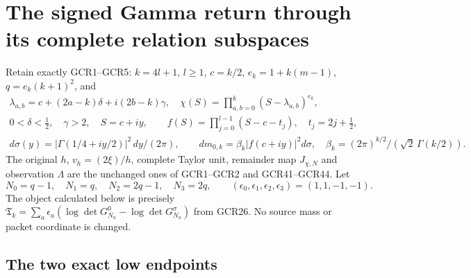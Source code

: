 \section{The signed Gamma return through its complete relation subspaces}
\label{sec:gsr-signed-gamma}

Retain exactly GCR1--GCR5: $k=4l+1$, $l\geq1$,
$c=k/2$, $e_k=1+k(m-1)$, $q=e_k(k+1)^2$, and
\[
\begin{gathered}
 \lambda_{a,b}=c+(2a-k)\delta+i(2b-k)\gamma,\quad
 \chi(S)=\prod_{a,b=0}^k(S-\lambda_{a,b})^{e_k},\\
 0<\delta<\tfrac12,\quad\gamma>2,\quad S=c+iy,\qquad
 f(S)=\prod_{j=0}^{l-1}(S-c-t_j),\quad t_j=2j+\tfrac12,\\
 d\sigma(y)=|\Gamma(1/4+iy/2)|^2\,dy/(2\pi),\qquad
 dm_{0,k}=\beta_k|f(c+iy)|^2d\sigma,\quad
 \beta_k=(2\pi)^{k/2}/(\sqrt2\,\Gamma(k/2)).
\end{gathered}\tag{GSR1}
\]
The original $h$, $v_h=(2\xi)/h$, complete Taylor unit,
remainder map $J_{\chi,N}$ and observation $\Lambda$ are the
unchanged ones of GCR1--GCR2 and GCR41--GCR44.
Let
\[
 N_0=q-1,\quad N_1=q,\quad N_2=2q-1,\quad N_3=2q,
 \qquad(\epsilon_0,\epsilon_1,\epsilon_2,\epsilon_3)=(1,1,-1,-1).
\]
The object calculated below is precisely
$\mathfrak T_k=\sum_a\epsilon_a
(\log\det G_{N_a}^0-\log\det G_{N_a}^\sigma)$
from GCR26. No source mass or packet coordinate is changed.

\subsection{The two exact low endpoints}

